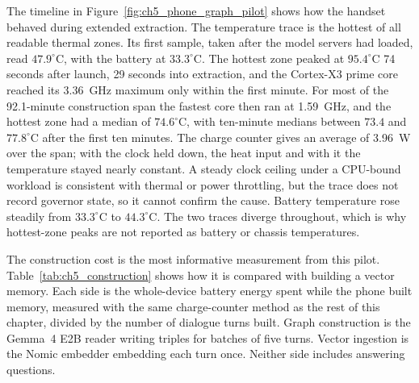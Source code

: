 The timeline in Figure~\ref{fig:ch5_phone_graph_pilot} shows how the handset behaved during
extended extraction. The temperature trace is the hottest of all readable thermal zones. Its first
sample, taken after the model servers had loaded, read $47.9^\circ\text{C}$, with the battery at
$33.3^\circ\text{C}$. The hottest zone peaked at $95.4^\circ\text{C}$ 74 seconds after launch, 29 seconds
into extraction, and the Cortex-X3 prime core reached its 3.36~GHz maximum only within the first minute.
For most of the 92.1-minute construction span the fastest core then ran at 1.59~GHz, and the hottest zone
had a median of $74.6^\circ\text{C}$, with ten-minute medians between $73.4$ and $77.8^\circ\text{C}$ after
the first ten minutes. The charge counter gives an average of 3.96~W over the span; with the clock held
down, the heat input and with it the temperature stayed nearly constant. A steady clock ceiling under a
CPU-bound workload is consistent with thermal or power throttling, but the trace does not record governor
state, so it cannot confirm the cause. Battery temperature rose steadily from $33.3^\circ\text{C}$ to
$44.3^\circ\text{C}$. The two traces diverge throughout, which is why hottest-zone peaks are not reported
as battery or chassis temperatures.

The construction cost is the most informative measurement from this pilot.
Table~\ref{tab:ch5_construction} shows how it is compared with building a vector memory. Each side
is the whole-device battery energy spent while the phone built memory, measured with the same
charge-counter method as the rest of this chapter, divided by the number of dialogue turns built.
Graph construction is the Gemma~4 E2B reader writing triples for batches of five turns. Vector
ingestion is the Nomic embedder embedding each turn once. Neither side includes answering questions.

